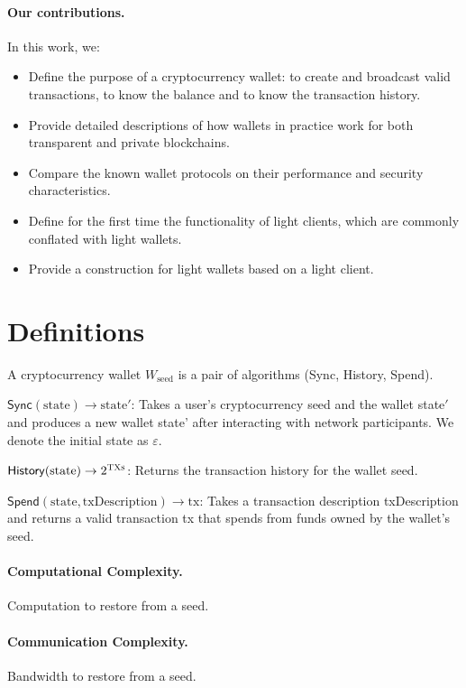 \documentclass[sigconf,authordraft]{acmart}
\begin{document}
\paragraph{Our contributions.} In this work, we:
\begin{itemize}
    \item Define the purpose of a cryptocurrency wallet: to create and broadcast valid transactions, to know the balance and to know the transaction history.
    \item Provide detailed descriptions of how wallets in practice work for both transparent and private blockchains.
    \item Compare the known wallet protocols on their performance and security characteristics.
    \item Define for the first time the functionality of light clients, which are commonly conflated with light wallets.
    \item Provide a construction for light wallets based on a light client.
\end{itemize}

\section{Definitions}
\begin{definition}
    A cryptocurrency wallet $W_\text{seed}$ is a pair of algorithms (\textsf{Sync}, \textsf{History}, \textsf{Spend}).
    
    $\mathsf{Sync}(\text{state}) \rightarrow \text{state}'$: Takes a user's cryptocurrency seed and the wallet state$'$ and produces a new wallet state' after interacting with network participants. We denote the initial state as $\varepsilon$.
    
    $\mathsf{History}(\text{state}) \rightarrow 2^\textsc{TXs}$: Returns the transaction history for the wallet seed.
    
    $\mathsf{Spend}(\text{state}, \text{txDescription}) \rightarrow \text{tx}$: Takes a transaction description txDescription and returns a valid transaction tx that spends from funds owned by the wallet's seed.
\end{definition}

\paragraph{Computational Complexity.} Computation to restore from a seed.
\paragraph{Communication Complexity.} Bandwidth to restore from a seed.
\end{document}
